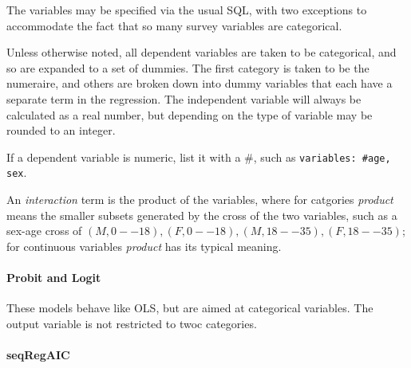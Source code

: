 \documentclass{article}
\begin{document}
The variables may be specified via the usual SQL, with two exceptions to accommodate the
fact that so many survey variables are categorical.

Unless otherwise noted, all dependent variables are taken to be categorical, and so are expanded to
a set of dummies. The first category is taken to be the numeraire, and others are broken
down into dummy variables that each have a separate term in the regression. The
independent variable will always be calculated as a real number, but depending on the type
of variable may be rounded to an integer.

If a dependent variable is numeric, list it with a \#, such as {\tt variables:
\#age, sex}.

An {\em interaction} term is the product of the variables, where for catgories {\em
product} means the smaller subsets generated by the cross of the two variables, such as
a sex-age cross of $(M, 0--18), (F, 0--18), (M, 18--35), (F, 18--35)$; for continuous
variables {\em product} has its typical meaning.



\paragraph{Probit and Logit} These models behave like OLS, but are aimed at categorical
variables. The output variable is not restricted to twoc categories.

\paragraph{seqRegAIC}
\end{document}
